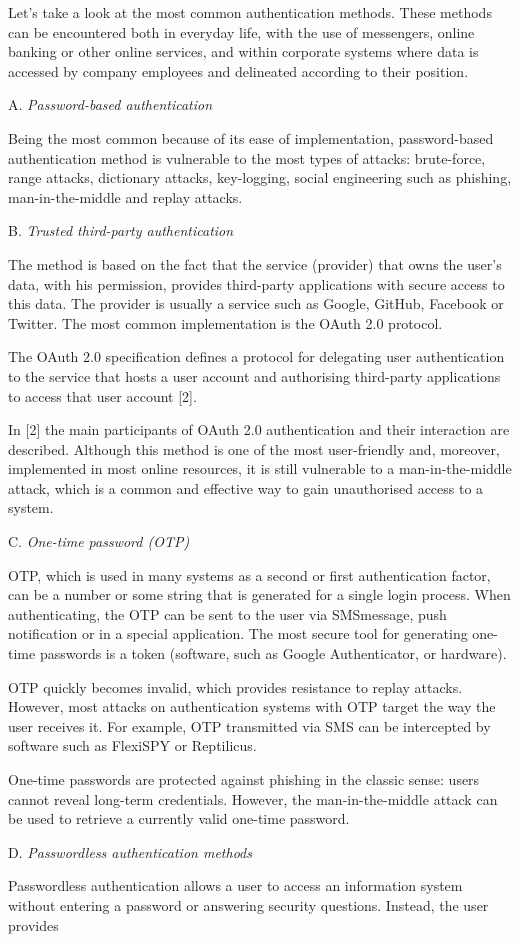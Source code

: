 \documentclass{article}
\begin{document}
\begin{multicols}{2}
\begin{center}
\end{center}
\par
Let’s take a look at the most common authentication
methods. These methods can be encountered both in
everyday life, with the use of messengers, online banking
or other online services, and within corporate systems
where data is accessed by company employees and
delineated according to their position.
\par 
A. \textit{Password-based authentication}
\par
Being the most common because of its ease of
implementation, password-based authentication method is
vulnerable to the most types of attacks: brute-force, range
attacks, dictionary attacks, key-logging, social engineering
such as phishing, man-in-the-middle and replay attacks.
\par
B. \textit{Trusted third-party authentication}
\par
The method is based on the fact that the service
(provider) that owns the user’s data, with his permission,
provides third-party applications with secure access to
this data. The provider is usually a service such as
Google, GitHub, Facebook or Twitter. The most common
implementation is the OAuth 2.0 protocol.
\par
The OAuth 2.0 specification defines a protocol for
delegating user authentication to the service that hosts a
user account and authorising third-party applications to
access that user account [2].
\par
In [2] the main participants of OAuth 2.0 authentication
and their interaction are described. Although this method
is one of the most user-friendly and, moreover, implemented in most online resources, it is still vulnerable
to a man-in-the-middle attack, which is a common and
effective way to gain unauthorised access to a system.
\par
C. \textit{One-time password (OTP)}
\par
OTP, which is used in many systems as a second
or first authentication factor, can be a number or some
string that is generated for a single login process. When
authenticating, the OTP can be sent to the user via SMSmessage, push notification or in a special application.
The most secure tool for generating one-time passwords
is a token (software, such as Google Authenticator, or
hardware).
\par
OTP quickly becomes invalid, which provides resistance to replay attacks. However, most attacks on
authentication systems with OTP target the way the user
receives it. For example, OTP transmitted via SMS can be
intercepted by software such as FlexiSPY or Reptilicus.
\par
One-time passwords are protected against phishing in
the classic sense: users cannot reveal long-term credentials.
However, the man-in-the-middle attack can be used to
retrieve a currently valid one-time password.
\par
D. \textit{Passwordless authentication methods}
\par
Passwordless authentication allows a user to access
an information system without entering a password or
answering security questions. Instead, the user provides
\end{multicols}
\end{document}

